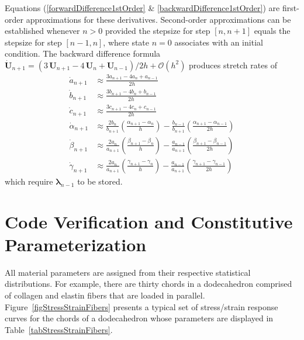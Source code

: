Equations (\ref{forwardDifference1stOrder} \& \ref{backwardDifference1stOrder}) are first-order approximations for these derivatives.  Second-order approximations can be established whenever $n > 0$ provided the stepsize for step $[n, n+1]$ equals the stepsize for step $[n-1, n]$, where state $n=0$ associates with an initial condition.  The backward difference formula  $\dot{\boldsymbol{U}}_{n+1} = ( 3 \, \boldsymbol{U}_{n+1} -  4 \, \boldsymbol{U}_{n} + \boldsymbol{U}_{n-1} ) / 2h + \mathcal{O}(h^2)$ produces stretch rates of
\begin{equation}
\begin{aligned}
\dot{a}_{n+1} & 
\approx \frac {3a_{n+1} - 4a_{n} +  a_{n-1}}{2h} \\ 
\dot{b}_{n+1} & 
\approx \frac {3b_{n+1} - 4b_{n} +  b_{n-1}}{2h} \\
\dot{c}_{n+1} & 
\approx \frac {3c_{n+1} - 4c_{n} +  c_{n-1}}{2h} \\
\dot{\alpha}_{n+1} & 
\approx \frac{2b_{n}} {b_{n+1}} \left( \frac{\alpha_{n+1} - \alpha_{n}}{h} \right) - \frac{b_{n-1}} {b_{n+1}} \left( \frac{\alpha_{n+1} - \alpha_{n-1}}{2h} \right) \\
\dot{\beta}_{n+1} & 
\approx \frac{2a_{n}}{a_{n+1}} \left( \frac{\beta_{n+1} - \beta_{n} }{h} \right) - \frac{a_{n-1}} {a_{n+1}} \left( \frac{\beta_{n+1} - \beta_{n-1}}{2h} \right) \\ 
\dot{\gamma}_{n+1} & 
\approx \frac{2a_{n}} {a_{n+1}} \left(\frac{\gamma_{n+1} - \gamma_{n}}{h} \right) - \frac{a_{n-1}}{a_{n+1}} \left( \frac{\gamma_{n+1} - \gamma_{n-1}}{2h} \right) 
\end{aligned}
\label{backwardDifference2ndOrder}
\end{equation}
which require $\boldsymbol{\lambda}_{n-1}$ to be stored.

\section{Code Verification and Constitutive Parameterization}

All material parameters are assigned from their respective statistical distributions.  For example, there are thirty chords in a dodecahedron comprised of collagen and elastin fibers that are loaded in parallel.  Figure~\ref{figStressStrainFibers} presents a typical set of stress\slash strain response curves for the chords of a dodecahedron whose parameters are displayed in Table~\ref{tabStressStrainFibers}.

